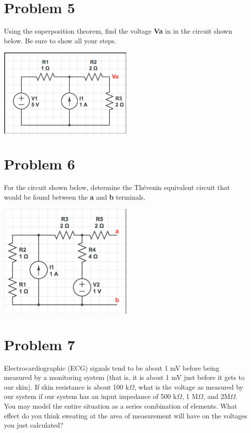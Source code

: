 \documentclass[11pt]{book}
\begin{document}
\section{Problem 5}
Using the superposition theorem, find the voltage \color{red} \textbf{Va} \color{black} in in the circuit shown below. Be sure to show all your steps.

\begin{center}
	\includegraphics[width=0.5\textwidth]{figures/hw2.05.png}
\end{center}

\section{Problem 6}
For the circuit shown below, determine the Thévenin equivalent circuit that would be found between the \color{red}\textbf{a} \color{black} and \color{red} \textbf{b} \color{black} terminals.
\begin{center}
	\includegraphics[width=0.5\textwidth]{figures/hw2.06.png}
\end{center}

\section{Problem 7}
Electrocardiographic (ECG) signals tend to be about 1 mV before being measured by a monitoring system (that is, it is about 1 mV just before it gets to our skin). If skin resistance is about 100 k$\Omega$, what is the voltage as measured by our system if our system has an input impedance of 500 k$\Omega$, 1 M$\Omega$, and 2M$\Omega$. You may model the entire situation as a series combination of elements. What effect do you think sweating at the area of measurement will have on the voltages you just calculated?
\end{document}
